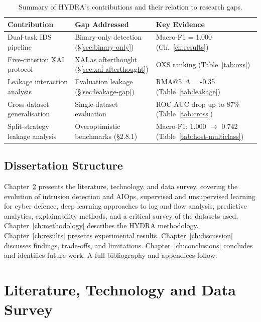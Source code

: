 \documentclass[12pt,a4paper]{report}
\begin{document}
\begin{table}[H]
\caption{Summary of HYDRA's contributions and their relation to research gaps.}
\label{tab:contributions}
\centering
\begin{tabular}{p{}p{}p{}}
\toprule
\textbf{Contribution} & \textbf{Gap Addressed} & \textbf{Key Evidence} \\
\midrule
Dual-task IDS pipeline & Binary-only detection (\S\ref{sec:binary-only}) & Macro-F1 = 1.000 (Ch.~\ref{ch:results}) \\
Five-criterion XAI protocol & XAI as afterthought (\S\ref{sec:xai-afterthought}) & OXS ranking (Table~\ref{tab:oxs}) \\
Leakage interaction analysis & Evaluation leakage (\S\ref{sec:leakage-gap}) & RMA@5 $\Delta$ = -0.35 (Table~\ref{tab:leakage}) \\
Cross-dataset generalisation & Single-dataset evaluation & ROC-AUC drop up to 87\% (Table~\ref{tab:cross}) \\
Split-strategy leakage analysis & Overoptimistic benchmarks (§2.8.1) & Macro-F1: 1.000 $\to$ 0.742 (Table~\ref{tab:host-multiclass}) \\
\bottomrule
\end{tabular}
\end{table}

\section{Dissertation Structure}
\label{sec:structure}

Chapter~\ref{ch:literature} presents the literature, technology, and data survey, covering the evolution of intrusion detection and AIOps, supervised and unsupervised learning for cyber defence, deep learning approaches to log and flow analysis, predictive analytics, explainability methods, and a critical survey of the datasets used. Chapter~\ref{ch:methodology} describes the HYDRA methodology. Chapter~\ref{ch:results} presents experimental results. Chapter~\ref{ch:discussion} discusses findings, trade-offs, and limitations. Chapter~\ref{ch:conclusions} concludes and identifies future work. A full bibliography and appendices follow.

\chapter{Literature, Technology and Data Survey}
\label{ch:literature}
\end{document}

